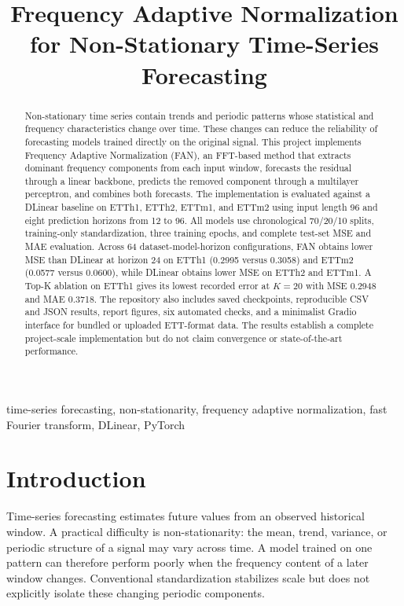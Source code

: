 \documentclass[conference,10pt]{IEEEtran}
\title{Frequency Adaptive Normalization for Non-Stationary Time-Series Forecasting}
\author{
\IEEEauthorblockN{Meet Dhorajiya (202451053) \quad
Daksh Amalseda (202451012) \quad
Keval Chorada (202451089)}
\IEEEauthorblockA{Artificial Intelligence Project: Non-Stationary Time-Series Forecasting\\
Code: \url{https://github.com/meetdhorajiya/FAN}}
}
\begin{document}
\maketitle

\begin{abstract}
Non-stationary time series contain trends and periodic patterns whose statistical and frequency characteristics change over time. These changes can reduce the reliability of forecasting models trained directly on the original signal. This project implements Frequency Adaptive Normalization (FAN), an FFT-based method that extracts dominant frequency components from each input window, forecasts the residual through a linear backbone, predicts the removed component through a multilayer perceptron, and combines both forecasts. The implementation is evaluated against a DLinear baseline on ETTh1, ETTh2, ETTm1, and ETTm2 using input length 96 and eight prediction horizons from 12 to 96. All models use chronological 70/20/10 splits, training-only standardization, three training epochs, and complete test-set MSE and MAE evaluation. Across 64 dataset-model-horizon configurations, FAN obtains lower MSE than DLinear at horizon 24 on ETTh1 (0.2995 versus 0.3058) and ETTm2 (0.0577 versus 0.0600), while DLinear obtains lower MSE on ETTh2 and ETTm1. A Top-K ablation on ETTh1 gives its lowest recorded error at $K=20$ with MSE 0.2948 and MAE 0.3718. The repository also includes saved checkpoints, reproducible CSV and JSON results, report figures, six automated checks, and a minimalist Gradio interface for bundled or uploaded ETT-format data. The results establish a complete project-scale implementation but do not claim convergence or state-of-the-art performance.
\end{abstract}

\begin{IEEEkeywords}
time-series forecasting, non-stationarity, frequency adaptive normalization, fast Fourier transform, DLinear, PyTorch
\end{IEEEkeywords}

\section{Introduction}
Time-series forecasting estimates future values from an observed historical window. A practical difficulty is non-stationarity: the mean, trend, variance, or periodic structure of a signal may vary across time. A model trained on one pattern can therefore perform poorly when the frequency content of a later window changes. Conventional standardization stabilizes scale but does not explicitly isolate these changing periodic components.
\end{document}
